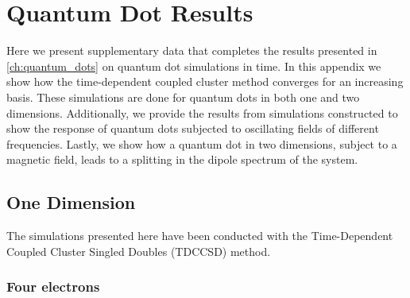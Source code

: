 \chapter{Quantum Dot Results}

Here we present supplementary data that completes the results presented in 
\autoref{ch:quantum_dots} on quantum dot simulations in time. In this appendix we 
show how the time-dependent coupled cluster method 
converges for an increasing basis. These simulations are done for quantum dots in both
one and two dimensions.
Additionally, we provide the results from simulations constructed to show the response 
of quantum dots subjected to oscillating fields of different frequencies.
Lastly, we show how a quantum dot in two
dimensions, subject to a magnetic field, leads to a splitting in the dipole spectrum 
of the system.

\vfill
\pagebreak

\section{One Dimension}
\label{app:1d_qd}

The simulations presented here have been conducted with the Time-Dependent Coupled 
Cluster Singled Doubles (TDCCSD) method.

\subsection*{Four electrons}

